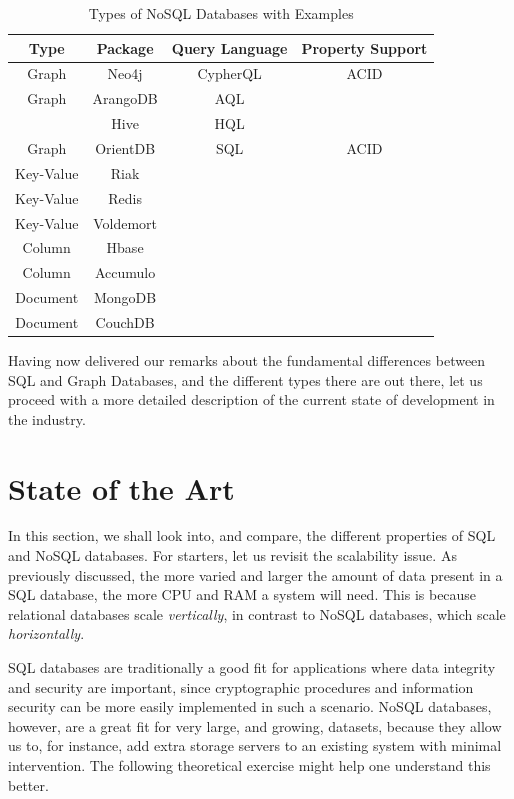 \documentclass[10pt,        %
               a4paper,     %
               journal,     %
               ]{IEEEtran}
\begin{document}
\begin{table}[!t]
	\renewcommand{\arraystretch}{1.3} %
	\caption{Types of NoSQL Databases with Examples}
	\label{table_types_nosql}
	\centering
	\begin{tabular}{|c|c|c|c|}
		\hline
		Type & Package & Query Language & Property Support  \\
		\hline
		Graph & Neo4j & CypherQL & ACID \\
		\hline
		Graph & ArangoDB & AQL & \\
		\hline
		 & Hive & HQL & \\
		\hline
		Graph & OrientDB & SQL & ACID \\
		\hline
		Key-Value & Riak & &  \\
		\hline
		Key-Value & Redis & & \\
		\hline
		Key-Value & Voldemort & & \\
		\hline
		Column & Hbase & & \\
		\hline
		Column & Accumulo & & \\
		\hline
		Document & MongoDB & & \\
		\hline
		Document & CouchDB & & \\
		\hline
	\end{tabular}
\end{table}

Having now delivered our remarks about the fundamental differences between SQL and Graph Databases, and the different types there are out there, let us proceed with a more detailed description of the current state of development in the industry.

\section{State of the Art}
In this section, we shall look into, and compare, the different properties of SQL and NoSQL databases. For starters, let us revisit the scalability issue. As previously discussed, the more varied and larger the amount of data present in a SQL database, the more CPU and RAM a system will need. This is because relational databases scale \textit{vertically}, in contrast to NoSQL databases, which scale \textit{horizontally}. \par
SQL databases are traditionally a good fit for applications where data integrity and security are important, since cryptographic procedures and information security can be more easily implemented in such a scenario. NoSQL databases, however, are a great fit for very large, and growing, datasets, because they allow us to, for instance, add extra storage servers to an existing system with minimal intervention. The following theoretical exercise might help one understand this better. \par
\end{document}
